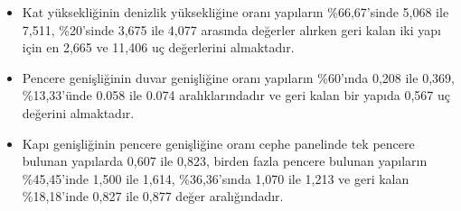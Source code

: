 \documentclass[12pt,turkish,a4paperpaper,]{report}
\providecommand{\tightlist}{%
  \setlength{\itemsep}{0pt}\setlength{\parskip}{0pt}}
\begin{document}
\begin{itemize}
\tightlist
\item
  Kat yüksekliğinin denizlik yüksekliğine oranı yapıların \%66,67'sinde
  5,068 ile 7,511, \%20'sinde 3,675 ile 4,077 arasında değerler alırken
  geri kalan iki yapı için en 2,665 ve 11,406 uç değerlerini almaktadır.
\item
  Pencere genişliğinin duvar genişliğine oranı yapıların \%60'ında 0,208
  ile 0,369, \%13,33'ünde 0.058 ile 0.074 aralıklarındadır ve geri kalan
  bir yapıda 0,567 uç değerini almaktadır.
\item
  Kapı genişliğinin pencere genişliğine oranı cephe panelinde tek
  pencere bulunan yapılarda 0,607 ile 0,823, birden fazla pencere
  bulunan yapıların \%45,45'inde 1,500 ile 1,614, \%36,36'sında 1,070
  ile 1,213 ve geri kalan \%18,18'inde 0,827 ile 0,877 değer
  aralığındadır.
\end{itemize}
\end{document}

